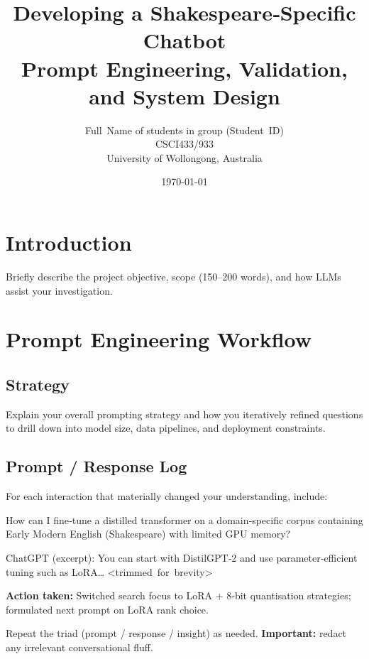 \documentclass[11pt,a4paper]{article}
\title{Developing a Shakespeare‑Specific Chatbot\\
	\large Prompt Engineering, Validation, and System Design}
\author{Full Name of students in group (Student ID)\\
	CSCI433/933\\
	University of Wollongong, Australia}
\date{\today}
\begin{document}
	\maketitle
	\section{Introduction}
	Briefly describe the project objective, scope (150–200 words), and how
	LLMs assist your investigation.
	
	\section{Prompt Engineering Workflow}
	\subsection{Strategy}
	Explain your overall prompting strategy and how you iteratively refined
	questions to drill down into model size, data pipelines, and deployment
	constraints.
	
	\subsection{Prompt / Response Log}
	For each interaction that materially changed your understanding,
	include:
	
	\begin{promptbox}
		How can I fine‑tune a distilled transformer on a domain‑specific corpus
		containing Early Modern English (Shakespeare) with limited GPU memory?
	\end{promptbox}
	
	\begin{responsebox}
		ChatGPT (excerpt):  
		You can start with DistilGPT‑2 and use parameter‑efficient tuning
		such as LoRA… <trimmed for brevity>
	\end{responsebox}
	
	\begin{insightbox}
		\textbf{Action taken:} Switched search focus to LoRA + 8‑bit
		quantisation strategies; formulated next prompt on LoRA rank choice.
	\end{insightbox}
	
	Repeat the triad (prompt / response / insight) as needed.  
	\textbf{Important:} redact any irrelevant conversational fluff.
	
\end{document}
